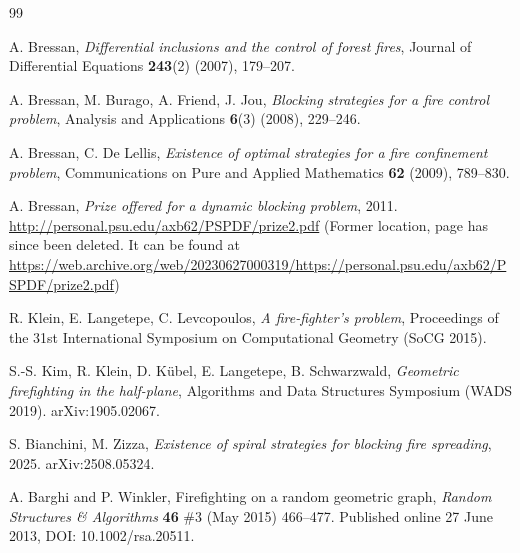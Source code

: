 \documentclass[12pt]{article}
\theoremstyle{plain}
\theoremstyle{definition}
\begin{document}
\begin{thebibliography}{99}

A. Bressan, \emph{Differential inclusions and the control of forest fires}, Journal of Differential Equations \textbf{243}(2) (2007), 179--207.

A. Bressan, M. Burago, A. Friend, J. Jou, \emph{Blocking strategies for a fire control problem}, Analysis and Applications \textbf{6}(3) (2008), 229--246.

A. Bressan, C. De Lellis, \emph{Existence of optimal strategies for a fire confinement problem}, Communications on Pure and Applied Mathematics \textbf{62} (2009), 789--830.

A. Bressan, \emph{Prize offered for a dynamic blocking problem}, 2011. \url{http://personal.psu.edu/axb62/PSPDF/prize2.pdf} (Former location, page has since been deleted. It can be found at \url{https://web.archive.org/web/20230627000319/https://personal.psu.edu/axb62/PSPDF/prize2.pdf})

R. Klein, E. Langetepe, C. Levcopoulos, \emph{A fire-fighter's problem}, Proceedings of the 31st International Symposium on Computational Geometry (SoCG 2015).

S.-S. Kim, R. Klein, D. K\"ubel, E. Langetepe, B. Schwarzwald, \emph{Geometric firefighting in the half-plane}, Algorithms and Data Structures Symposium (WADS 2019). arXiv:1905.02067.

S. Bianchini, M. Zizza, \emph{Existence of spiral strategies for blocking fire spreading}, 2025. arXiv:2508.05324.

 A. Barghi and P. Winkler, Firefighting on a random geometric graph,
{\em Random Structures \& Algorithms} {\bf 46} \#3 (May 2015) 466--477.
Published online 27 June 2013, DOI: 10.1002/rsa.20511.

\end{thebibliography}
\end{document}
